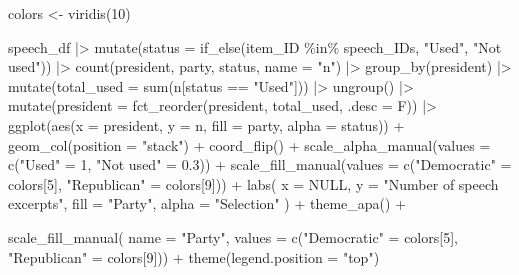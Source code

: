 \documentclass[
  man]{apa7}
\newenvironment{Shaded}{\begin{snugshade}}{\end{snugshade}}
\newcommand{\AttributeTok}[1]{\textcolor[rgb]{0.40,0.45,0.13}{#1}}
\newcommand{\ConstantTok}[1]{\textcolor[rgb]{0.56,0.35,0.01}{#1}}
\newcommand{\DecValTok}[1]{\textcolor[rgb]{0.68,0.00,0.00}{#1}}
\newcommand{\FloatTok}[1]{\textcolor[rgb]{0.68,0.00,0.00}{#1}}
\newcommand{\FunctionTok}[1]{\textcolor[rgb]{0.28,0.35,0.67}{#1}}
\newcommand{\NormalTok}[1]{\textcolor[rgb]{0.00,0.23,0.31}{#1}}
\newcommand{\OtherTok}[1]{\textcolor[rgb]{0.00,0.23,0.31}{#1}}
\newcommand{\SpecialCharTok}[1]{\textcolor[rgb]{0.37,0.37,0.37}{#1}}
\newcommand{\StringTok}[1]{\textcolor[rgb]{0.13,0.47,0.30}{#1}}
\begin{document}
\begin{Shaded}
\begin{Highlighting}[]
\NormalTok{colors }\OtherTok{\textless{}{-}} \FunctionTok{viridis}\NormalTok{(}\DecValTok{10}\NormalTok{) }

\NormalTok{speech\_df }\SpecialCharTok{|\textgreater{}} 
  \FunctionTok{mutate}\NormalTok{(}\AttributeTok{status =} \FunctionTok{if\_else}\NormalTok{(item\_ID }\SpecialCharTok{\%in\%}\NormalTok{ speech\_IDs, }\StringTok{"Used"}\NormalTok{, }\StringTok{"Not used"}\NormalTok{)) }\SpecialCharTok{|\textgreater{}} 
  \FunctionTok{count}\NormalTok{(president, party, status, }\AttributeTok{name =} \StringTok{"n"}\NormalTok{) }\SpecialCharTok{|\textgreater{}}
  \FunctionTok{group\_by}\NormalTok{(president) }\SpecialCharTok{|\textgreater{}}
  \FunctionTok{mutate}\NormalTok{(}\AttributeTok{total\_used =} \FunctionTok{sum}\NormalTok{(n[status }\SpecialCharTok{==} \StringTok{"Used"}\NormalTok{])) }\SpecialCharTok{|\textgreater{}}
  \FunctionTok{ungroup}\NormalTok{() }\SpecialCharTok{|\textgreater{}}
  \FunctionTok{mutate}\NormalTok{(}\AttributeTok{president =} \FunctionTok{fct\_reorder}\NormalTok{(president, total\_used, }\AttributeTok{.desc =}\NormalTok{ F)) }\SpecialCharTok{|\textgreater{}}
  \FunctionTok{ggplot}\NormalTok{(}\FunctionTok{aes}\NormalTok{(}\AttributeTok{x =}\NormalTok{ president, }\AttributeTok{y =}\NormalTok{ n, }\AttributeTok{fill =}\NormalTok{ party, }\AttributeTok{alpha =}\NormalTok{ status)) }\SpecialCharTok{+}
    \FunctionTok{geom\_col}\NormalTok{(}\AttributeTok{position =} \StringTok{"stack"}\NormalTok{) }\SpecialCharTok{+}
    \FunctionTok{coord\_flip}\NormalTok{() }\SpecialCharTok{+}
    \FunctionTok{scale\_alpha\_manual}\NormalTok{(}\AttributeTok{values =} \FunctionTok{c}\NormalTok{(}\StringTok{"Used"} \OtherTok{=} \DecValTok{1}\NormalTok{, }\StringTok{"Not used"} \OtherTok{=} \FloatTok{0.3}\NormalTok{)) }\SpecialCharTok{+}
    \FunctionTok{scale\_fill\_manual}\NormalTok{(}\AttributeTok{values =} \FunctionTok{c}\NormalTok{(}\StringTok{"Democratic"} \OtherTok{=}\NormalTok{ colors[}\DecValTok{5}\NormalTok{], }\StringTok{"Republican"} \OtherTok{=}\NormalTok{ colors[}\DecValTok{9}\NormalTok{])) }\SpecialCharTok{+}
    \FunctionTok{labs}\NormalTok{(}
      \AttributeTok{x =} \ConstantTok{NULL}\NormalTok{,}
      \AttributeTok{y =} \StringTok{"Number of speech excerpts"}\NormalTok{,}
      \AttributeTok{fill =} \StringTok{"Party"}\NormalTok{,}
      \AttributeTok{alpha =} \StringTok{"Selection"}
\NormalTok{    ) }\SpecialCharTok{+}
        \FunctionTok{theme\_apa}\NormalTok{() }\SpecialCharTok{+} 
  
  \FunctionTok{scale\_fill\_manual}\NormalTok{(}
  \AttributeTok{name =} \StringTok{"Party"}\NormalTok{,  }
  \AttributeTok{values =} \FunctionTok{c}\NormalTok{(}\StringTok{"Democratic"} \OtherTok{=}\NormalTok{ colors[}\DecValTok{5}\NormalTok{], }\StringTok{"Republican"} \OtherTok{=}\NormalTok{ colors[}\DecValTok{9}\NormalTok{])) }\SpecialCharTok{+}
  \FunctionTok{theme}\NormalTok{(}\AttributeTok{legend.position =} \StringTok{"top"}\NormalTok{)}
\end{Highlighting}
\end{Shaded}
\end{document}
